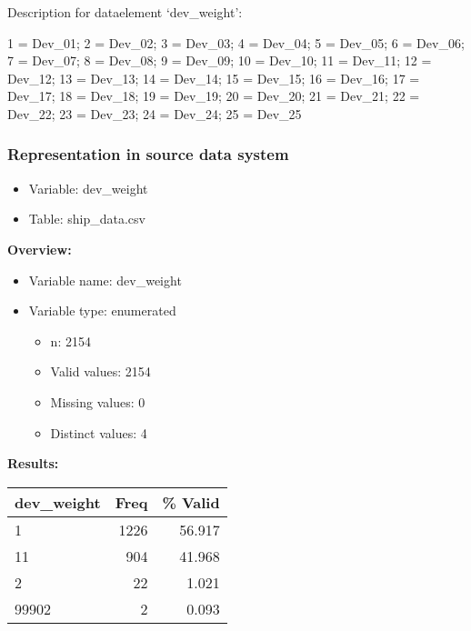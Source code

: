 \documentclass[
]{article}
\providecommand{\tightlist}{%
  \setlength{\itemsep}{0pt}\setlength{\parskip}{0pt}}
\begin{document}
Description for dataelement `dev\_weight':

1 = Dev\_01; 2 = Dev\_02; 3 = Dev\_03; 4 = Dev\_04; 5 = Dev\_05; 6 =
Dev\_06; 7 = Dev\_07; 8 = Dev\_08; 9 = Dev\_09; 10 = Dev\_10; 11 =
Dev\_11; 12 = Dev\_12; 13 = Dev\_13; 14 = Dev\_14; 15 = Dev\_15; 16 =
Dev\_16; 17 = Dev\_17; 18 = Dev\_18; 19 = Dev\_19; 20 = Dev\_20; 21 =
Dev\_21; 22 = Dev\_22; 23 = Dev\_23; 24 = Dev\_24; 25 = Dev\_25

\hypertarget{representation-in-source-data-system-7}{%
\subsubsection{\texorpdfstring{Representation in \textbf{source} data
system}{Representation in source data system}}\label{representation-in-source-data-system-7}}

\begin{itemize}
\tightlist
\item
  Variable: dev\_weight
\item
  Table: ship\_data.csv
\end{itemize}

\textbf{Overview:}

\begin{itemize}
\tightlist
\item
  Variable name: dev\_weight
\item
  Variable type: enumerated

  \begin{itemize}
  \tightlist
  \item
    n: 2154
  \item
    Valid values: 2154
  \item
    Missing values: 0
  \item
    Distinct values: 4
  \end{itemize}
\end{itemize}

\textbf{Results:}\\

\begin{table}[H]
\centering
\begin{tabular}{l|r|r}
\hline
\textbf{dev\_weight} & \textbf{Freq} & \textbf{\% Valid}\\
\hline
1 & 1226 & 56.917\\
\hline
11 & 904 & 41.968\\
\hline
2 & 22 & 1.021\\
\hline
99902 & 2 & 0.093\\
\hline
\end{tabular}
\end{table}
\end{document}
